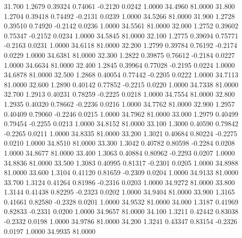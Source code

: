   31.700   1.2679   0.39324   0.74061  -0.2120   0.0242   1.0000  34.4960  81.0000
  31.800   1.2704   0.39418   0.74492  -0.2131   0.0239   1.0000  34.5266  81.0000
  31.900   1.2728   0.39510   0.74920  -0.2142   0.0236   1.0000  34.5561  81.0000
  32.000   1.2752   0.39602   0.75347  -0.2152   0.0234   1.0000  34.5845  81.0000
  32.100   1.2775   0.39694   0.75771  -0.2163   0.0231   1.0000  34.6118  81.0000
  32.200   1.2799   0.39784   0.76192  -0.2174   0.0229   1.0000  34.6381  81.0000
  32.300   1.2822   0.39875   0.76612  -0.2184   0.0227   1.0000  34.6634  81.0000
  32.400   1.2845   0.39964   0.77028  -0.2195   0.0224   1.0000  34.6878  81.0000
  32.500   1.2868   0.40054   0.77442  -0.2205   0.0222   1.0000  34.7113  81.0000
  32.600   1.2890   0.40142   0.77852  -0.2215   0.0220   1.0000  34.7338  81.0000
  32.700   1.2913   0.40231   0.78259  -0.2225   0.0218   1.0000  34.7554  81.0000
  32.800   1.2935   0.40320   0.78662  -0.2236   0.0216   1.0000  34.7762  81.0000
  32.900   1.2957   0.40409   0.79060  -0.2246   0.0215   1.0000  34.7962  81.0000
  33.000   1.2979   0.40499   0.79454  -0.2255   0.0213   1.0000  34.8152  81.0000
  33.100   1.3000   0.40590   0.79842  -0.2265   0.0211   1.0000  34.8335  81.0000
  33.200   1.3021   0.40684   0.80224  -0.2275   0.0210   1.0000  34.8510  81.0000
  33.300   1.3042   0.40782   0.80598  -0.2284   0.0208   1.0000  34.8677  81.0000
  33.400   1.3063   0.40884   0.80962  -0.2293   0.0207   1.0000  34.8836  81.0000
  33.500   1.3083   0.40995   0.81317  -0.2301   0.0205   1.0000  34.8988  81.0000
  33.600   1.3104   0.41120   0.81659  -0.2309   0.0204   1.0000  34.9133  81.0000
  33.700   1.3124   0.41264   0.81986  -0.2316   0.0203   1.0000  34.9272  81.0000
  33.800   1.3144   0.41438   0.82295  -0.2323   0.0202   1.0000  34.9404  81.0000
  33.900   1.3165   0.41661   0.82580  -0.2328   0.0201   1.0000  34.9532  81.0000
  34.000   1.3187   0.41969   0.82833  -0.2331   0.0200   1.0000  34.9657  81.0000
  34.100   1.3211   0.42442   0.83038  -0.2332   0.0198   1.0000  34.9786  81.0000
  34.200   1.3241   0.43347   0.83154  -0.2326   0.0197   1.0000  34.9935  81.0000
